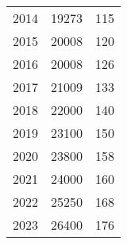 \begin{table}[htbp]
\begin{tabular}{l*{1}{cc}}
2014                          &       19273&         115\\
2015                          &       20008&         120\\
2016                          &       20008&         126\\
2017                          &       21009&         133\\
2018                          &       22000&         140\\
2019                          &       23100&         150\\
2020                          &       23800&         158\\
2021                          &       24000&         160\\
2022                          &       25250&         168\\
2023                          &       26400&         176\\
\hline\hline
\end{tabular}
\end{table}

